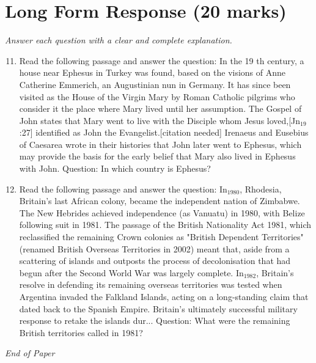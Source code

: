 \documentclass[12pt]{article}
\begin{document}
\section*{Long Form Response (20 marks)}
\textit{Answer each question with a clear and complete explanation.}
\begin{enumerate}[label=\arabic*.]
\setcounter{enumi}{10}
\item Read the following passage and answer the question: In the 19 th century, a house near Ephesus in Turkey was found, based on the visions of Anne Catherine Emmerich, an Augustinian nun in Germany. It has since been visited as the House of the Virgin Mary by Roman Catholic pilgrims who consider it the place where Mary lived until her assumption. The Gospel of John states that Mary went to live with the Disciple whom Jesus loved,[Jn$_{19}$:27] identified as John the Evangelist.[citation needed] Irenaeus and Eusebius of Caesarea wrote in their histories that John later went to Ephesus, which may provide the basis for the early belief that Mary also lived in Ephesus with John. Question: In which country is Ephesus?
\item Read the following passage and answer the question: In$_{1980}$, Rhodesia, Britain's last African colony, became the independent nation of Zimbabwe. The New Hebrides achieved independence (as Vanuatu) in 1980, with Belize following suit in 1981. The passage of the British Nationality Act 1981, which reclassified the remaining Crown colonies as "British Dependent Territories" (renamed British Overseas Territories in 2002) meant that, aside from a scattering of islands and outposts the process of decolonisation that had begun after the Second World War was largely complete. In$_{1982}$, Britain's resolve in defending its remaining overseas territories was tested when Argentina invaded the Falkland Islands, acting on a long-standing claim that dated back to the Spanish Empire. Britain's ultimately successful military response to retake the islands dur... Question: What were the remaining British territories called in 1981?
\end{enumerate}

\vfill
\noindent\textit{End of Paper}
\end{document}
